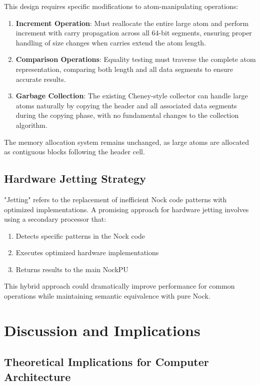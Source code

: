 \documentclass[twoside]{article}
\begin{document}
\noindent
This design requires specific modifications to atom-manipulating operations:

\begin{enumerate}
  \item \textbf{Increment Operation}: Must reallocate the entire large atom and perform increment with carry propagation across all 64-bit segments, ensuring proper handling of size changes when carries extend the atom length.
  \item \textbf{Comparison Operations}: Equality testing must traverse the complete atom representation, comparing both length and all data segments to ensure accurate results.
  \item \textbf{Garbage Collection}: The existing Cheney-style collector can handle large atoms naturally by copying the header and all associated data segments during the copying phase, with no fundamental changes to the collection algorithm.
\end{enumerate}

\noindent
The memory allocation system remains unchanged, as large atoms are allocated as contiguous blocks following the header cell.

\subsection{Hardware Jetting Strategy}

"Jetting" refers to the replacement of inefficient Nock code patterns with optimized implementations. A promising approach for hardware jetting involves using a secondary processor that:

\begin{enumerate}
  \item Detects specific patterns in the Nock code
  \item Executes optimized hardware implementations
  \item Returns results to the main NockPU
\end{enumerate}

\noindent
This hybrid approach could dramatically improve performance for common operations while maintaining semantic equivalence with pure Nock.

\section{Discussion and Implications}

\subsection{Theoretical Implications for Computer Architecture}
\end{document}
